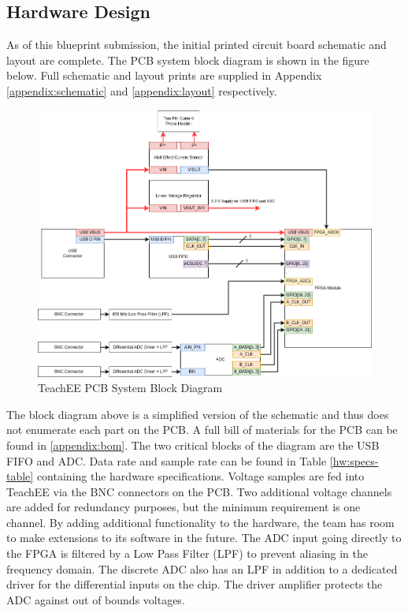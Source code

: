 \documentclass[letterpaper,12pt]{article}
\begin{document}

\subsection{Hardware Design}
As of this blueprint submission, the initial printed circuit board schematic and
layout are complete. The PCB system block diagram is shown in the figure below.
Full schematic and layout prints are supplied in Appendix
\ref{appendix:schematic} and \ref{appendix:layout} respectively.
\begin{figure}[H]
    \centering
    \includegraphics[width=16cm]{../../misc/TeachEE-System-Diagram.drawio.png}
    \caption{TeachEE PCB System Block Diagram}
    \label{fig:pcb-block-diagram}
\end{figure}

\noindent
The block diagram above is a simplified version of the schematic and thus does
not enumerate each part on the PCB. A full bill of materials for the PCB can be
found in \ref{appendix:bom}. The two critical blocks of the diagram are the USB
FIFO and ADC. Data rate and sample rate can be found in Table
\ref{hw:specs-table} containing the hardware specifications. Voltage samples are
fed into TeachEE via the BNC connectors on the PCB. Two additional voltage
channels are added for redundancy purposes, but the minimum requirement is one
channel. By adding additional functionality to the hardware, the team has room
to make extensions to its software in the future. The ADC input going directly
to the FPGA is filtered by a Low Pass Filter (LPF) to prevent aliasing in the
frequency domain. The discrete ADC also has an LPF in addition to a dedicated
driver for the differential inputs on the chip. The driver amplifier protects
the ADC against out of bounds voltages.
\end{document}
